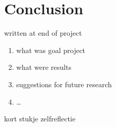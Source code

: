 \section{Conclusion}
written at end of project

\begin{enumerate}
\item what was goal project
\item what were results
\item suggestions for future research
\item \ldots
\end{enumerate}

kort stukje zelfreflectie